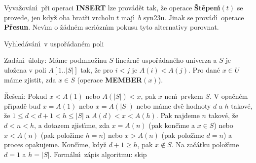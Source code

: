 \flushpar Vyva\v zov\'an\'\i\ p\v ri operaci {\bf INSERT} lze prov\'ad\v et 
tak, \v ze operace {\bf \v St\v epen\'\i$\left(t\right)$} se provede, jen kdy\v z oba 
brat\v ri vrcholu $t$ maj\'\i\ $b$ syn\accent23u. Jinak se prov\'ad\'\i\ 
operace {\bf P\v resun}. Nev\'\i m o \v z\'adn\'em seri\'ozn\'\i m pokusu tyto 
alternativy porovnat.   
\medskip

\heading
Vyhled\'av\'an\'\i\ v uspo\v r\'adan\'em poli
\endheading

\flushpar Zad\'an\'\i\ \'ulohy: M\'ame podmno\v zinu $S$ line\'arn\v e 
uspo\v r\'adan\'eho univerza a $S$ je ulo\v zena v poli 
$A\left[1..|S|\right]$ tak, \v ze pro $i<j$ je $A\left(i\right)<A\left(j\right)$. Pro dan\'e $x\in 
U$ 
m\'ame zjistit, zda $x\in S$ (operace {\bf MEMBER$\left(x\right)$}).
\medskip

\flushpar\v Re\v sen\'\i :  Pokud $x<A\left(1\right)$ nebo $A\left(|S|\right)<x$, pak $
x$ 
nen\'\i\ prvkem $S$.  V opa\v cn\'em p\v r\'\i pad\v e bu\v d $x=
A\left(1\right)$ nebo 
$x=A\left(|S|\right)$ nebo m\'ame dv\v e hodnoty $d$ 
a $h$ takov\'e, \v ze $1\le d<d+1<h\le |S|$ a $A\left(d\right)<x<A\left(h\right)$.  Pak 
najdeme $n$ takov\'e, \v ze $d<n<h$, a dotazem 
zjist\'\i me, zda $x=A\left(n\right)$ (pak kon\v c\'\i me a $x\in S$) nebo 
$x<A\left(n\right)$ (pak polo\v z\'\i me $h=n$) nebo $x>A\left(n\right)$ (pak 
polo\v z\'\i me $d=n$) a proces opakujeme.  Kon\v c\'\i me, kdy\v z 
$d+1\ge h$, pak $x\notin S$. Na za\v c\'atku polo\v z\'\i me $d=1$ a $
h=|S|$.
Form\'aln\'\i\ z\'apis algoritmu:
skip

